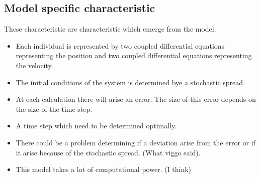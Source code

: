 \documentclass[10pt,a4paper]{article}
\begin{document}
\subsection{Model specific characteristic}
These characteristic are characteristic which emerge from the model.
\begin{itemize}
\item Each individual is represented by two coupled differential equations representing the position and two coupled differential equations representing the velocity.
\item The initial conditions of the system is determined bye a stochastic spread.
\item At each calculation there will arise an error. The size of this error depends on the size of the time step.
\item A time step which need to be determined optimally.

\item There could be a problem determining if a deviation arise from the error or if it arise because of the stochastic spread. (What viggo said).

\item This model takes a lot of computational power. (I think)

\end{itemize}
\end{document}
